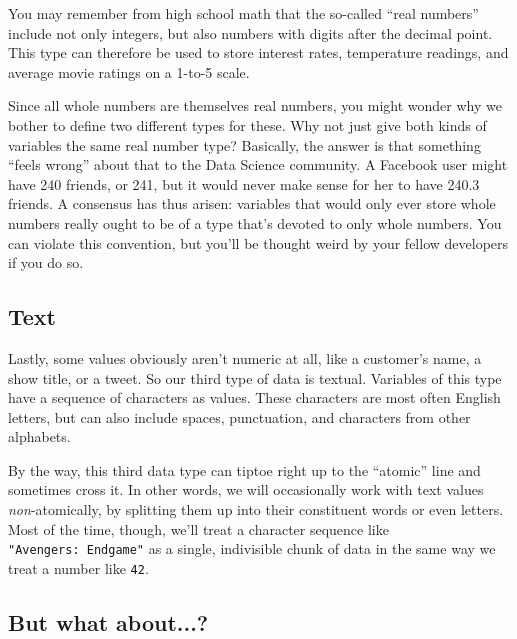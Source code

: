 You may remember from high school math that the so-called ``real numbers''
include not only integers, but also numbers with digits after the decimal
point. This type can therefore be used to store interest rates, temperature
readings, and average movie ratings on a 1-to-5 scale.

Since all whole numbers are themselves real numbers, you might wonder why we
bother to define two different types for these. Why not just give both kinds of
variables the same real number type? Basically, the answer is that something
``feels wrong'' about that to the Data Science community. A Facebook user might
have 240 friends, or 241, but it would never make sense for her to have 240.3
friends. A consensus has thus arisen: variables that would only ever store
whole numbers really ought to be of a type that's devoted to only whole
numbers. You can violate this convention, but you'll be thought weird by your
fellow developers if you do so.


\subsection{Text}

Lastly, some values obviously aren't numeric at all, like a customer's name, a
show title, or a tweet. So our third type of data is textual. Variables of this
type have a sequence of characters as values. These characters are most often
English letters, but can also include spaces, punctuation, and characters from
other alphabets.

\label{tiptoe}

By the way, this third data type can tiptoe right up to the ``atomic'' line and
sometimes cross it. In other words, we will occasionally work with text values
\textit{non}-atomically, by splitting them up into their constituent words or
even letters. Most of the time, though, we'll treat a character sequence like
\texttt{"Avengers:\ Endgame"} as a single, indivisible chunk of data in the
same way we treat a number like \texttt{42}.

\subsection{But what about...?}

